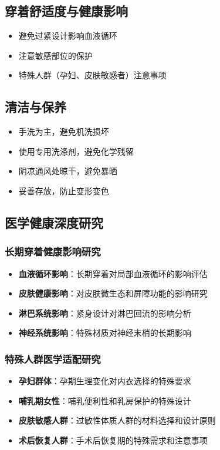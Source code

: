 \documentclass[12pt,UTF8]{ctexbook}
\begin{document}
\subsection{穿着舒适度与健康影响}
\begin{itemize}[leftmargin=2cm]
	\item 避免过紧设计影响血液循环
	\item 注意敏感部位的保护
	\item 特殊人群（孕妇、皮肤敏感者）注意事项
\end{itemize}

\subsection{清洁与保养}
\begin{itemize}[leftmargin=2cm]
	\item 手洗为主，避免机洗损坏
	\item 使用专用洗涤剂，避免化学残留
	\item 阴凉通风处晾干，避免暴晒
	\item 妥善存放，防止变形变色
\end{itemize}

\subsection{医学健康深度研究}
\subsubsection{长期穿着健康影响研究}
\begin{itemize}[leftmargin=2cm]
	\item \textbf{血液循环影响}：长期穿着对局部血液循环的影响评估
	\item \textbf{皮肤健康影响}：对皮肤微生态和屏障功能的影响研究
	\item \textbf{淋巴系统影响}：紧身设计对淋巴回流的影响分析
	\item \textbf{神经系统影响}：特殊材质对神经末梢的长期影响
\end{itemize}

\subsubsection{特殊人群医学适配研究}
\begin{itemize}[leftmargin=2cm]
	\item \textbf{孕妇群体}：孕期生理变化对内衣选择的特殊要求
	\item \textbf{哺乳期女性}：哺乳便利性和乳房保护的特殊设计
	\item \textbf{皮肤敏感人群}：过敏性体质人群的材料选择和设计原则
	\item \textbf{术后恢复人群}：手术后恢复期的特殊需求和注意事项
\end{itemize}
\end{document}
